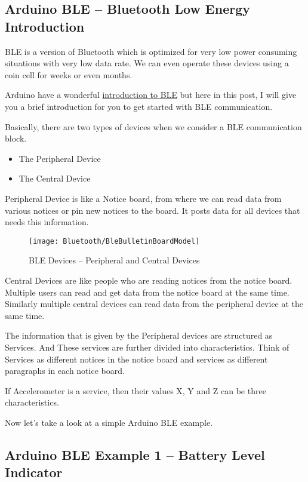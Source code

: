\subsection{Arduino BLE – Bluetooth Low Energy Introduction}

BLE is a version of Bluetooth which is optimized for very low power consuming situations with very low data rate. We can even operate these devices using a coin cell for weeks or even months.
 
 Arduino have a wonderful \href{https://www.arduino.cc/reference/en/libraries/arduinoble/}{introduction to BLE}  but here in this post, I will give you a brief introduction for you to get started with BLE communication.
 
 Basically, there are two types of devices when we consider a BLE communication block.
 
\begin{itemize}
  \item The Peripheral Device
  \item The Central Device
\end{itemize}

Peripheral Device is like a Notice board, from where we can read data from various notices or pin new notices to the board. It posts data for all devices that needs this information.

\begin{figure}
  \texttt{[image: Bluetooth/BleBulletinBoardModel]}
  \caption{BLE Devices -- Peripheral and Central Devices}    
\end{figure}


Central Devices are like people who are reading notices from the notice board. Multiple users can read and get data from the notice board at the same time. Similarly multiple central devices can read data from the peripheral device at the same time. 

The information that is given by the Peripheral devices are structured as Services. And These services are further divided into characteristics. Think of Services as different notices in the notice board and services as different paragraphs in each notice board.

If Accelerometer is a service, then their values X, Y and Z can be three characteristics.

Now let's take a look at a simple Arduino BLE example. 

\subsection{Arduino BLE Example 1 -- Battery Level Indicator}

